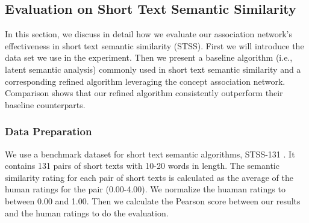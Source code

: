 \subsection{Evaluation on Short Text Semantic Similarity}
In this section, we discuss in detail how we evaluate our association network's
effectiveness in short text semantic similarity (STSS).
First we will introduce the data set we use in the experiment. Then we 
present a baseline algorithm 
(i.e., latent semantic analysis)
commonly used in short text semantic similarity
and a corresponding refined algorithm leveraging 
the concept association network. 
Comparison shows that our refined algorithm consistently outperform 
their baseline counterparts.

\subsubsection{Data Preparation}
\label{sec:preprocess}
%
We use a benchmark dataset for short text semantic algorithms, 
STSS-131 \cite{o2013new}. It contains 131 pairs of short texts with 
10-20 words in length. 
The semantic similarity rating for each pair of short texts is calculated 
as the average of the human ratings for the pair (0.00-4.00). 
We normalize the huaman ratings to between 
0.00 and 1.00. Then we calculate the Pearson score between our results 
and the human ratings to do the evaluation.  


